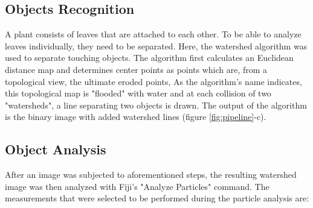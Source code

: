 \documentclass[paper=A4,bibliography=totocnumbered]{scrartcl}
\begin{document}
\subsection{Objects Recognition}
A plant consists of leaves that are attached to each other. To be able to analyze leaves individually, they need to be separated. Here, the watershed algorithm was used to separate touching objects. The algorithm first calculates an Euclidean distance map and determines center points as points which are, from a topological view, the ultimate eroded points, As the algorithm's name indicates, this topological map is "flooded" with water and at each collision of two "watersheds", a line separating two objects is drawn. The output of the algorithm is the binary image with added watershed lines (figure \ref{fig:pipeline}-c). 

\subsection{Object Analysis}
After an image was subjected to aforementioned steps, the resulting watershed image was then analyzed with Fiji's  "Analyze Particles" command. The measurements that were selected to be performed during the particle analysis are:
\end{document}
